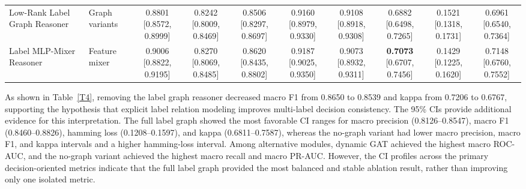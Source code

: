 \documentclass[Afour,sagev,times]{sagej}
\begin{document}
\begin{table}[h]
{\begin{tabular}{ll*{8}{c}}
Low-Rank Label Graph Reasoner & Graph variants & \shortstack{0.8801\\{[}0.8572, 0.8999{]}} & \shortstack{0.8242\\{[}0.8009, 0.8469{]}} & \shortstack{0.8506\\{[}0.8297, 0.8697{]}} & \shortstack{0.9160\\{[}0.8979, 0.9330{]}} & \shortstack{0.9108\\{[}0.8918, 0.9308{]}} & \shortstack{0.6882\\{[}0.6498, 0.7265{]}} & \shortstack{0.1521\\{[}0.1318, 0.1731{]}} & \shortstack{0.6961\\{[}0.6540, 0.7364{]}} \\
Label MLP-Mixer Reasoner & Feature mixer & \shortstack{0.9006\\{[}0.8822, 0.9195{]}} & \shortstack{0.8270\\{[}0.8069, 0.8485{]}} & \shortstack{0.8620\\{[}0.8435, 0.8802{]}} & \shortstack{0.9187\\{[}0.9025, 0.9350{]}} & \shortstack{0.9073\\{[}0.8932, 0.9311{]}} & \shortstack{\textbf{0.7073}\\{[}0.6707, 0.7456{]}} & \shortstack{0.1429\\{[}0.1225, 0.1620{]}} & \shortstack{0.7148\\{[}0.6760, 0.7552{]}} \\
\bottomrule
\end{tabular}
}
\end{table}

As shown in Table~\ref{T4}, removing the label graph reasoner decreased macro F1 from 0.8650 to 0.8539 and kappa from 0.7206 to 0.6767, supporting the hypothesis that explicit label relation modeling improves multi-label decision consistency. The 95\% CIs provide additional evidence for this interpretation. The full label graph showed the most favorable CI ranges for macro precision (0.8126--0.8547), macro F1 (0.8460--0.8826), hamming loss (0.1208--0.1597), and kappa (0.6811--0.7587), whereas the no-graph variant had lower macro precision, macro F1, and kappa intervals and a higher hamming-loss interval. Among alternative modules, dynamic GAT achieved the highest macro ROC-AUC, and the no-graph variant achieved the highest macro recall and macro PR-AUC. However, the CI profiles across the primary decision-oriented metrics indicate that the full label graph provided the most balanced and stable ablation result, rather than improving only one isolated metric.
\end{document}
